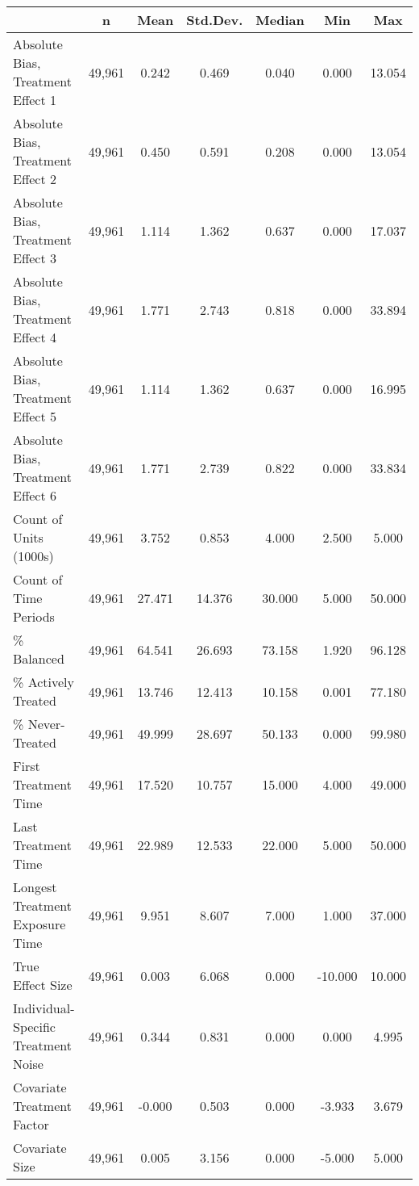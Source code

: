 {
\def\sym#1{\ifmmode^{#1}\else\(^{#1}\)\fi}
\begin{tabular}{l*{1}{cccccc}}
\hline\hline
                    &           n&        Mean&    Std.Dev.&      Median&         Min&         Max\\
\hline
Absolute Bias, Treatment Effect 1&      49,961&       0.242&       0.469&       0.040&       0.000&      13.054\\
Absolute Bias, Treatment Effect 2&      49,961&       0.450&       0.591&       0.208&       0.000&      13.054\\
Absolute Bias, Treatment Effect 3&      49,961&       1.114&       1.362&       0.637&       0.000&      17.037\\
Absolute Bias, Treatment Effect 4&      49,961&       1.771&       2.743&       0.818&       0.000&      33.894\\
Absolute Bias, Treatment Effect 5&      49,961&       1.114&       1.362&       0.637&       0.000&      16.995\\
Absolute Bias, Treatment Effect 6&      49,961&       1.771&       2.739&       0.822&       0.000&      33.834\\
Count of Units (1000s)&      49,961&       3.752&       0.853&       4.000&       2.500&       5.000\\
Count of Time Periods&      49,961&      27.471&      14.376&      30.000&       5.000&      50.000\\
\% Balanced         &      49,961&      64.541&      26.693&      73.158&       1.920&      96.128\\
\% Actively Treated &      49,961&      13.746&      12.413&      10.158&       0.001&      77.180\\
\% Never-Treated    &      49,961&      49.999&      28.697&      50.133&       0.000&      99.980\\
First Treatment Time&      49,961&      17.520&      10.757&      15.000&       4.000&      49.000\\
Last Treatment Time &      49,961&      22.989&      12.533&      22.000&       5.000&      50.000\\
Longest Treatment Exposure Time&      49,961&       9.951&       8.607&       7.000&       1.000&      37.000\\
True Effect Size    &      49,961&       0.003&       6.068&       0.000&     -10.000&      10.000\\
Individual-Specific Treatment Noise&      49,961&       0.344&       0.831&       0.000&       0.000&       4.995\\
Covariate Treatment Factor&      49,961&      -0.000&       0.503&       0.000&      -3.933&       3.679\\
Covariate Size      &      49,961&       0.005&       3.156&       0.000&      -5.000&       5.000\\
\hline\hline
\end{tabular}
}
